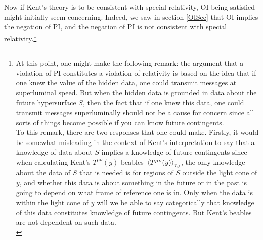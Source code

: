 Now if Kent's theory is to be consistent with special relativity, OI being satisfied might initially seem concerning. Indeed, we saw in section \ref{OISec} that OI implies the negation of PI, and the negation of PI is not consistent with special relativity.\footnote{At this point, one might make the following remark: the argument that a violation of PI constitutes a violation of relativity is based on the idea that if one knew the value of the hidden data, one could transmit messages at superluminal speed. But when the hidden data is grounded in data about the future hypersurface $S$, then the fact that if one knew this data, one could transmit messages superluminally should not be a cause for concern since all sorts of things become possible if you can know future contingents.
\vspace{1em}
\\
To this remark, there are two responses that one could make. Firstly, it would be somewhat misleading in the context of Kent's interpretation to say that a knowledge of data about $S$ implies a knowledge of future contingents since when calculating Kent's $T^{\mu\nu}(y)$-beables $\ev*{T^{\mu\nu}(y)}_{\tau_S}$, the only knowledge about the data of $S$ that is needed is for regions of $S$ outside the light cone of $y$, and whether this data is about something in the future or in the past is going to depend on what frame of reference one is in. Only when the data is within the light cone of $y$ will we be able to say categorically that knowledge of this data constitutes knowledge of future contingents. But Kent's beables are not dependent on such data.
\vspace{1em}
\\
}
